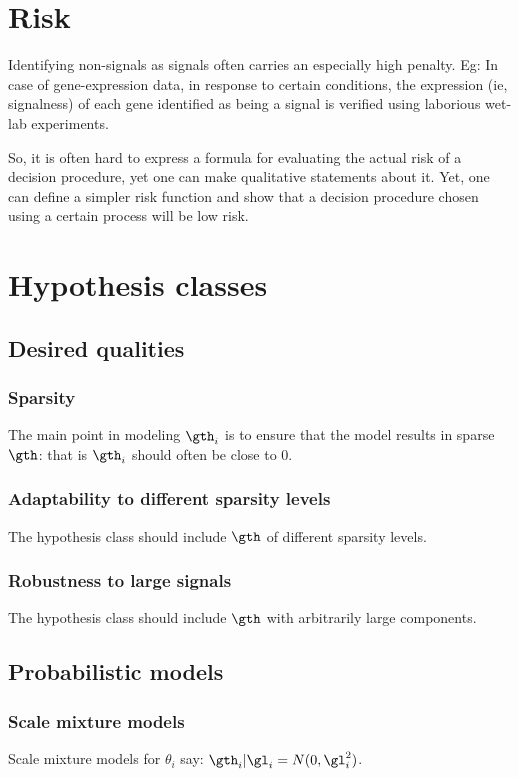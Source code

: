 \documentclass[oneside, article]{memoir}
\begin{document}
\section{Risk}
Identifying non-signals as signals often carries an especially high penalty. Eg: In case of gene-expression data, in response to certain conditions, the expression (ie, signalness) of each gene identified as being a signal is verified using laborious wet-lab experiments.

So, it is often hard to express a formula for evaluating the actual risk of a decision procedure, yet one can make qualitative statements about it. Yet, one can define a simpler risk function and show that a decision procedure chosen using a certain process will be low risk. \tbc

\section{Hypothesis classes}
\subsection{Desired qualities}
\subsubsection{Sparsity}
The main point in modeling $\gth_i$ is to ensure that the model results in sparse $\gth$: that is $\gth_i$ should often be close to 0.

\subsubsection{Adaptability to different sparsity levels}
The hypothesis class should include $\gth$ of different sparsity levels.

\subsubsection{Robustness to large signals}
The hypothesis class should include $\gth$ with arbitrarily large components.

\subsection{Probabilistic models}
\tbc

\subsubsection{Scale mixture models}
Scale mixture models for $\theta_i$ say: $\gth_i|\gl_i = N(0, \gl_i^2)$. 
\end{document}
